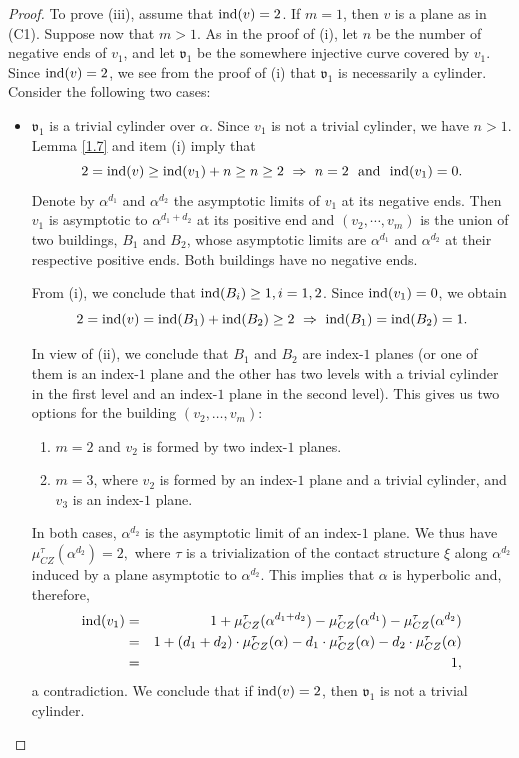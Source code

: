 \documentclass{amsart}
\newcommand{\CZ}{\mu_{CZ}^{\tau}}
\newcommand{\ind}{\textnormal{ind}}
\begin{document}
\begin{proof}
To prove (iii), assume that $\ind(v)=2$. If $m=1$, then $v$ is a plane as in (C1). Suppose now that $m>1$. As in the proof of (i), let $n$ be the number of negative ends of $v_1$, and let $\mathfrak{v}_1$ be the somewhere injective curve covered by $v_1$. Since $\ind(v)=2$, we see from the proof of (i) that $\mathfrak{v}_1$ is necessarily a cylinder. Consider the following two cases:
\begin{itemize}
 \item  $\mathfrak{v}_1$ is a trivial cylinder over $\alpha$. Since $v_1$ is not a trivial cylinder, we have $n>1$.
 Lemma \ref{1.7} and item (i) imply that
 \begin{equation*}
 2=\ind(v) \geq \ind(v_1)+n \geq n \geq 2 \,\, \Rightarrow \,\, n=2 \ \mbox{ and } \ \ind(v_1)=0.
 \end{equation*}
 Denote by $\alpha^{d_1}$ and $\alpha^{d_2}$ the asymptotic limits of $v_1$ at its negative ends. Then $v_1$ is asymptotic to $\alpha^{d_1+d_2}$ at its positive end and $(v_2, \cdots, v_m)$ is the union of two buildings, $B_1$ and $B_2$, whose asymptotic limits are $\alpha^{d_1}$ and $\alpha^{d_2}$ at their respective positive ends. Both buildings have no negative ends.
 
 From (i), we conclude that $\ind(B_i) \geq 1, i=1,2$. Since $\ind(v_1)=0$, we obtain
 $$2=\ind(v)=\ind(B_1)+\ind(B_2)\geq 2 \,\,\Rightarrow \,\, \ind(B_1)=\ind(B_2)=1.$$
 
 In view of (ii), we conclude that $B_1$ and $B_2$ are index-$1$ planes (or one of them is an index-$1$ plane and the other has two levels with a trivial cylinder in the first level and an index-$1$ plane in the second level).  This gives us two options for the building $(v_2, \ldots, v_m)$:
 \begin{enumerate}
 \item $m=2$ and $v_2$ is formed by two index-$1$ planes.
 \item $m=3$, where $v_2$ is formed by an index-$1$ plane and a trivial cylinder, and $v_3$ is an index-$1$  plane.
   
 \end{enumerate}
 In both cases, $\alpha^{d_2}$ is the asymptotic limit of an index-$1$ plane. We thus have
 $\CZ(\alpha^{d_2})=2,$
 where $\tau$ is a trivialization of the contact structure $\xi$ along $\alpha^{d_2}$ induced by a plane asymptotic to $\alpha^{d_2}$.
 This implies that $\alpha$ is hyperbolic and, therefore,
 \begin{eqnarray*}
 \ind(v_1)&=& 1+\CZ(\alpha^{d_1+d_2})-\CZ(\alpha^{d_1})-\CZ(\alpha^{d_2})\\
 &=& 1+(d_1+d_2)\cdot \CZ(\alpha)-d_1\cdot \CZ(\alpha)-d_2 \cdot\CZ(\alpha)\\
 &=&1,
 \end{eqnarray*}
 a contradiction. We conclude that if $\ind(v)=2$, then $\mathfrak{v}_1$ is not a trivial cylinder.
 

\end{itemize}
\end{proof}
\end{document}
